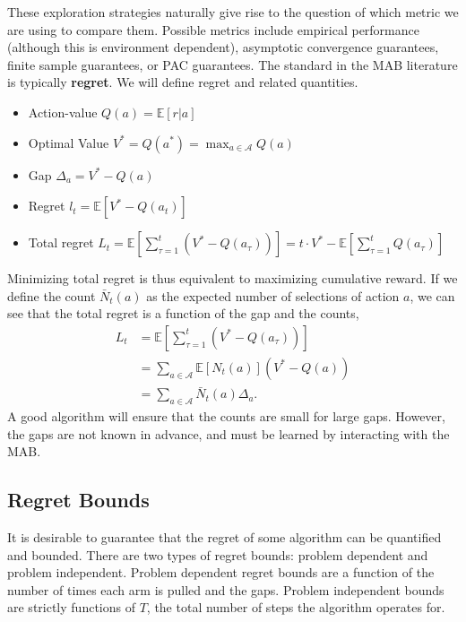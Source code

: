 \documentclass{article}
\newcommand{\E}{\mathbb{E}}                                        %
\begin{document}
These exploration strategies naturally give rise to the question of which metric we are using to compare them. Possible metrics include empirical performance (although this is environment dependent), asymptotic convergence guarantees, finite sample guarantees, or PAC guarantees. The standard in the MAB literature is typically \textbf{regret}. We will define regret and related quantities.
\begin{itemize}
    \item Action-value $Q(a) = \E[r | a]$
    \item Optimal Value $V^* = Q(a^*) = \max_{a \in \mathcal{A}} Q(a)$
    \item Gap $\Delta_a = V^* - Q(a)$
    \item Regret $l_t = \E[V^* - Q(a_t)]$
    \item Total regret $L_t = \E\left[ \sum_{\tau=1}^t \left( V^* - Q(a_\tau) \right) \right] = t \cdot V^* - \E\left[ \sum_{\tau=1}^t Q(a_\tau) \right]$
\end{itemize}
Minimizing total regret is thus equivalent to maximizing cumulative reward. If we define the count $\bar{N}_t(a)$ as the expected number of selections of action $a$, we can see that the total regret is a function of the gap and the counts,
\begin{align}
    L_t &= \E\left[ \sum_{\tau=1}^t \left( V^* - Q(a_\tau) \right) \right] \\
    &= \sum_{a \in \mathcal{A}} \E\left[ N_t(a) \right] (V^* - Q(a)) \\
    &= \sum_{a \in \mathcal{A}} \bar{N}_t(a) \Delta_a.
\end{align}
A good algorithm will ensure that the counts are small for large gaps. However, the gaps are not known in advance, and must be learned by interacting with the MAB.

\subsection{Regret Bounds}

It is desirable to guarantee that the regret of some algorithm can be quantified and bounded. There are two types of regret bounds: problem dependent and problem independent. Problem dependent regret bounds are a function of the number of times each arm is pulled and the gaps. Problem independent bounds are strictly functions of $T$, the total number of steps the algorithm operates for.
\end{document}
